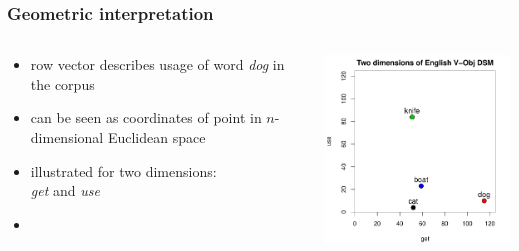 \documentclass[t]{beamer} %
\begin{document}
\begin{frame}
  \frametitle{Geometric interpretation}

  \begin{columns}[T]
    \begin{column}{40mm}
      \begin{itemize}
      \item row vector  describes usage of word \emph{dog} in the corpus
      \item can be seen as coordinates of point in $n$-dimensional Euclidean space
      \item illustrated for two dimensions:\\ \emph{get} and \emph{use}
      \item {}
      \end{itemize}
    \end{column}
    \begin{column}{75mm}      
      \ungap[1]
      \includegraphics[width=75mm]{img/hieroglyph_2d_1}
    \end{column}
  \end{columns}
\end{frame}
\end{document}

